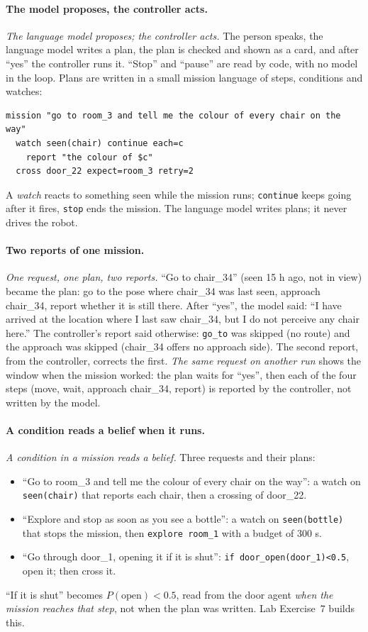 \documentclass[11pt]{article}
\newcommand{\slt}[1]{\emph{#1}}   %
\begin{document}
\paragraph{The model proposes, the controller acts.} \slt{The language model proposes; the controller acts.} The person speaks, the language model writes a plan, the plan is checked and shown as a card, and after ``yes'' the controller runs it. ``Stop'' and ``pause'' are read by code, with no model in the loop. Plans are written in a small mission language of steps, conditions and watches:
\begin{lstlisting}[language={}]
mission "go to room_3 and tell me the colour of every chair on the way"
  watch seen(chair) continue each=c
    report "the colour of $c"
  cross door_22 expect=room_3 retry=2
\end{lstlisting}
A \emph{watch} reacts to something seen while the mission runs; \texttt{continue} keeps going after it fires, \texttt{stop} ends the mission. The language model writes plans; it never drives the robot.

\paragraph{Two reports of one mission.} \slt{One request, one plan, two reports.} ``Go to chair\_34'' (seen 15 h ago, not in view) became the plan: go to the pose where chair\_34 was last seen, approach chair\_34, report whether it is still there. After ``yes'', the model said: ``I have arrived at the location where I last saw chair\_34, but I do not perceive any chair here.'' The controller's report said otherwise: \texttt{go\_to} was skipped (no route) and the approach was skipped (chair\_34 offers no approach side). The second report, from the controller, corrects the first. \slt{The same request on another run} shows the window when the mission worked: the plan waits for ``yes'', then each of the four steps (move, wait, approach chair\_34, report) is reported by the controller, not written by the model.

\paragraph{A condition reads a belief when it runs.} \slt{A condition in a mission reads a belief.} Three requests and their plans:
\begin{itemize}
\item ``Go to room\_3 and tell me the colour of every chair on the way'': a watch on \texttt{seen(chair)} that reports each chair, then a crossing of door\_22.
\item ``Explore and stop as soon as you see a bottle'': a watch on \texttt{seen(bottle)} that stops the mission, then \texttt{explore room\_1} with a budget of 300 s.
\item ``Go through door\_1, opening it if it is shut'': \texttt{if door\_open(door\_1)<0.5}, open it; then cross it.
\end{itemize}
``If it is shut'' becomes $P(\text{open})<0.5$, read from the door agent \emph{when the mission reaches that step}, not when the plan was written. Lab Exercise~7 builds this.
\end{document}
